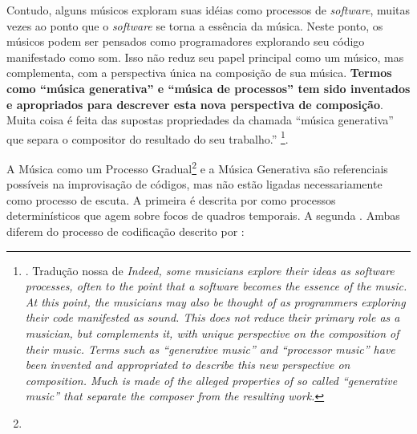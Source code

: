 \begin{citacao}
Contudo, alguns músicos exploram suas idéias como processos de \emph{software}, muitas vezes ao ponto que o \emph{software} se torna a essência da música. Neste ponto, os músicos podem ser pensados como programadores explorando seu código manifestado como som. Isso não reduz seu papel principal como um músico, mas complementa, com a perspectiva única na composição de sua música. \textbf{Termos como ``música generativa'' e ``música de processos'' tem sido inventados e apropriados para descrever esta nova perspectiva de composição}. Muita coisa é feita das supostas propriedades da chamada ``música generativa'' que separa o compositor do resultado do seu trabalho.'' %
\footnote{. Tradução nossa de \emph{Indeed, some musicians explore their ideas as software processes, often to the point that a software becomes the essence of the music. At this point, the musicians may also be thought of as programmers exploring their code manifested as sound. This does not reduce their primary role as a musician, but complements it, with unique perspective on the composition of their music. Terms such as “generative music” and “processor music” have been invented and appropriated to describe this new perspective on composition. Much is made of the alleged properties of so called “generative music” that separate the composer from the resulting work. }}.%
\end{citacao}

A Música como um Processo Gradual\footnote{} e a Música Generativa são referenciais possíveis na improvisação de códigos, mas não estão ligadas necessariamente como processo de escuta. A primeira é descrita por  como processos determinísticos que agem sobre focos de quadros temporais. A segunda  \cite{eno_generative_1996}. Ambas diferem do processo de codificação descrito por :

